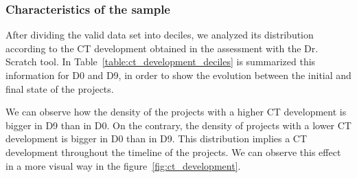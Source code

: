 \subsubsection{Characteristics of the sample}
\label{subsubsec:sample_distribution}

After dividing the valid data set into deciles, we analyzed its distribution according to the CT development obtained in the assessment with the Dr. Scratch tool. In Table~\ref{table:ct_development_deciles} is summarized this information for D0 and D9, in order to show the evolution between the initial and final state of the projects.

We can observe how the density of the projects with a higher CT development is bigger in D9 than in D0. On the contrary, the density of projects with a lower CT development is bigger in D0 than in D9. This distribution implies a CT development throughout the timeline of the projects. We can observe this effect in a more visual way in the figure~\ref{fig:ct_development}. 


